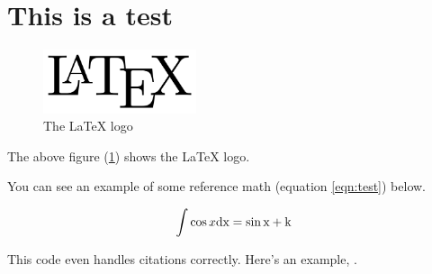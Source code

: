 \documentclass{article}
\begin{document}
\section{This is a test}

\begin{figure}
	\includegraphics[width=0.4\textwidth]{test.png}
	\caption{The LaTeX logo}
	\label{fig:latex}
\end{figure}

The above figure (\ref{fig:latex}) shows the LaTeX logo.

You can see an example of some reference math (equation \ref{eqn:test}) below.

\begin{equation}\label{eqn:test}
	\int \cos x \rm d x = \sin x + k
\end{equation}

This code even handles citations correctly. Here's an example, \cite{Lilley:2009zz}.
\end{document}
